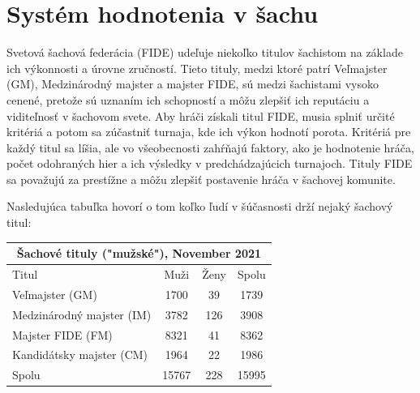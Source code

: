 \documentclass[10pt,oneside,slovak,a4paper]{article}
\begin{document}
\vspace*{\fill}

\section{Systém hodnotenia v šachu}
Svetová šachová federácia (FIDE) udeľuje niekoľko titulov šachistom na základe ich výkonnosti a úrovne zručností. Tieto tituly, medzi ktoré patrí Veľmajster (GM), Medzinárodný majster a majster FIDE, sú medzi šachistami vysoko cenené, pretože sú uznaním ich schopností a môžu zlepšiť ich reputáciu a viditeľnosť v šachovom svete. Aby hráči získali titul FIDE, musia splniť určité kritériá a potom sa zúčastniť turnaja, kde ich výkon hodnotí porota. Kritériá pre každý titul sa líšia, ale vo všeobecnosti zahŕňajú faktory, ako je hodnotenie hráča, počet odohraných hier a ich výsledky v predchádzajúcich turnajoch. Tituly FIDE sa považujú za prestížne a môžu zlepšiť postavenie hráča v šachovej komunite.

Nasledujúca tabuľka\cite{FIDE} hovorí o tom koľko ľudí v šúčasnosti drží nejaký šachový titul:


\begin{table}[H]
		\def\arraystretch{1.5}
		\centering
		\begin{tabular}{|lccc|}
			\hline
			\multicolumn{4}{|c|}{Šachové tituly ("mužské"), November 2021}                                                     \\ \hline
			\multicolumn{1}{|l|}{Titul}                       & \multicolumn{1}{c|}{Muži}  & \multicolumn{1}{c|}{Ženy} & Spolu \\ \hline
			\multicolumn{1}{|l|}{Veľmajster (GM)}             & \multicolumn{1}{c|}{1700}  & \multicolumn{1}{c|}{39}   & 1739  \\ \hline
			\multicolumn{1}{|l|}{Medzinárodný   majster (IM)} & \multicolumn{1}{c|}{3782}  & \multicolumn{1}{c|}{126}  & 3908  \\ \hline
			\multicolumn{1}{|l|}{Majster FIDE   (FM)}         & \multicolumn{1}{c|}{8321}  & \multicolumn{1}{c|}{41}   & 8362  \\ \hline
			\multicolumn{1}{|l|}{Kandidátsky   majster (CM)}  & \multicolumn{1}{c|}{1964}  & \multicolumn{1}{c|}{22}   & 1986  \\ \hline
			\multicolumn{1}{|l|}{Spolu}                       & \multicolumn{1}{c|}{15767} & \multicolumn{1}{c|}{228}  & 15995 \\ \hline
		\end{tabular}
\end{table}
\end{document}
